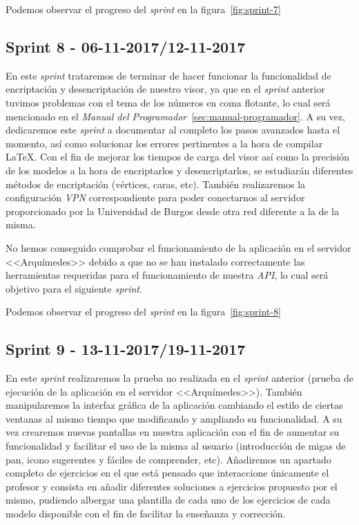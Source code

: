 Podemos observar el progreso del \textit{sprint} en la figura~\ref{fig:sprint-7}

\subsection{Sprint 8 - 06-11-2017/12-11-2017}
En este \textit{sprint} trataremos de terminar de hacer funcionar la funcionalidad de encriptación y desencriptación de nuestro visor, ya que en el \textit{sprint} anterior tuvimos problemas con el tema de los números en coma flotante, lo cual será mencionado en el \textit{Manual del Programador}~\ref{sec:manual-programador}. A su vez, dedicaremos este \textit{sprint} a documentar al completo los pasos avanzados hasta el momento, así como solucionar los errores pertinentes a la hora de compilar \LaTeX.
Con el fin de mejorar los tiempos de carga del visor así como la precisión de los modelos a la hora de encriptarlos y desencriptarlos, se estudiarán diferentes métodos de encriptación (vértices, caras, etc). También realizaremos la configuración \textit{VPN} correspondiente para poder conectarnos al servidor proporcionado por la Universidad de Burgos desde otra red diferente a la de la misma.

No hemos conseguido comprobar el funcionamiento de la aplicación en el servidor <<Arquímedes>> debido a que no se han instalado correctamente las herramientas requeridas para el funcionamiento de nuestra \textit{API}, lo cual será objetivo para el siguiente \textit{sprint}.

Podemos observar el progreso del \textit{sprint} en la figura~\ref{fig:sprint-8}

\subsection{Sprint 9 - 13-11-2017/19-11-2017}
En este \textit{sprint} realizaremos la prueba no realizada en el \textit{sprint} anterior (prueba de ejecución de la aplicación en el servidor <<Arquímedes>>). También manipularemos la interfaz gráfica de la aplicación cambiando el estilo de ciertas ventanas al mismo tiempo que modificando y ampliando su funcionalidad. A su vez crearemos nuevas pantallas en nuestra aplicación con el fin de aumentar su funcionalidad y facilitar el uso de la misma al usuario (introducción de migas de pan, icono sugerentes y fáciles de comprender, etc). Añadiremos un apartado completo de ejercicios en el que está pensado que interaccione únicamente el profesor y consista en añadir diferentes soluciones a ejercicios propuesto por el mismo, pudiendo albergar una plantilla de cada uno de los ejercicios de cada modelo disponible con el fin de facilitar la enseñanza y corrección. 

